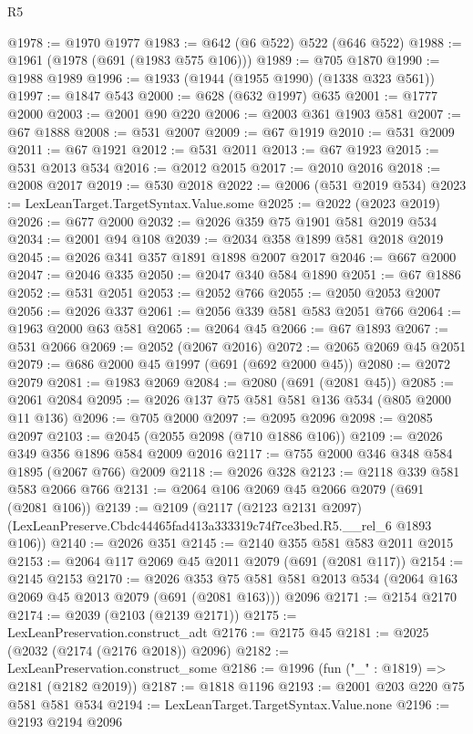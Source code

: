 \begin{lexlean}{R5}
\begin{coremodule}
@1978 := @1970 @1977
@1983 := @642 (@6 @522) @522 (@646 @522)
@1988 := @1961 (@1978 (@691 (@1983 @575 @106)))
@1989 := @705 @1870
@1990 := @1988 @1989
@1996 := @1933 (@1944 (@1955 @1990) (@1338 @323 @561))
@1997 := @1847 @543
@2000 := @628 (@632 @1997) @635
@2001 := @1777 @2000
@2003 := @2001 @90 @220
@2006 := @2003 @361 @1903 @581
@2007 := @67 @1888
@2008 := @531 @2007
@2009 := @67 @1919
@2010 := @531 @2009
@2011 := @67 @1921
@2012 := @531 @2011
@2013 := @67 @1923
@2015 := @531 @2013 @534
@2016 := @2012 @2015
@2017 := @2010 @2016
@2018 := @2008 @2017
@2019 := @530 @2018
@2022 := @2006 (@531 @2019 @534)
@2023 := LexLeanTarget.TargetSyntax.Value.some
@2025 := @2022 (@2023 @2019)
@2026 := @677 @2000
@2032 := @2026 @359 @75 @1901 @581 @2019 @534
@2034 := @2001 @94 @108
@2039 := @2034 @358 @1899 @581 @2018 @2019
@2045 := @2026 @341 @357 @1891 @1898 @2007 @2017
@2046 := @667 @2000
@2047 := @2046 @335
@2050 := @2047 @340 @584 @1890
@2051 := @67 @1886
@2052 := @531 @2051
@2053 := @2052 @766
@2055 := @2050 @2053 @2007
@2056 := @2026 @337
@2061 := @2056 @339 @581 @583 @2051 @766
@2064 := @1963 @2000 @63 @581
@2065 := @2064 @45
@2066 := @67 @1893
@2067 := @531 @2066
@2069 := @2052 (@2067 @2016)
@2072 := @2065 @2069 @45 @2051
@2079 := @686 @2000 @45 @1997 (@691 (@692 @2000 @45))
@2080 := @2072 @2079
@2081 := @1983 @2069
@2084 := @2080 (@691 (@2081 @45))
@2085 := @2061 @2084
@2095 := @2026 @137 @75 @581 @581 @136 @534 (@805 @2000 @11 @136)
@2096 := @705 @2000
@2097 := @2095 @2096
@2098 := @2085 @2097
@2103 := @2045 (@2055 @2098 (@710 @1886 @106))
@2109 := @2026 @349 @356 @1896 @584 @2009 @2016
@2117 := @755 @2000 @346 @348 @584 @1895 (@2067 @766) @2009
@2118 := @2026 @328
@2123 := @2118 @339 @581 @583 @2066 @766
@2131 := @2064 @106 @2069 @45 @2066 @2079 (@691 (@2081 @106))
@2139 := @2109
    (@2117
      (@2123 @2131 @2097)
      (LexLeanPreserve.Cbdc44465fad413a333319c74f7ce3bed.R5.__rel_6 @1893 @106))
@2140 := @2026 @351
@2145 := @2140 @355 @581 @583 @2011 @2015
@2153 := @2064 @117 @2069 @45 @2011 @2079 (@691 (@2081 @117))
@2154 := @2145 @2153
@2170 := @2026
    @353
    @75
    @581
    @581
    @2013
    @534
    (@2064 @163 @2069 @45 @2013 @2079 (@691 (@2081 @163)))
    @2096
@2171 := @2154 @2170
@2174 := @2039 (@2103 (@2139 @2171))
@2175 := LexLeanPreservation.construct_adt
@2176 := @2175 @45
@2181 := @2025 (@2032 (@2174 (@2176 @2018)) @2096)
@2182 := LexLeanPreservation.construct_some
@2186 := @1996 (fun ("_" : @1819) => @2181 (@2182 @2019))
@2187 := @1818 @1196
@2193 := @2001 @203 @220 @75 @581 @581 @534
@2194 := LexLeanTarget.TargetSyntax.Value.none
@2196 := @2193 @2194 @2096

\end{coremodule}
\end{lexlean}
